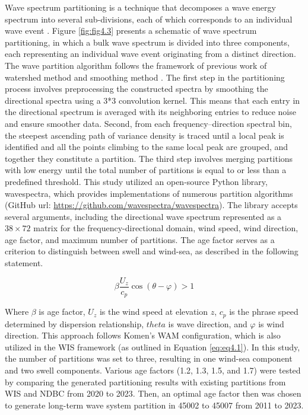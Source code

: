 Wave spectrum partitioning is a technique that decomposes a wave energy spectrum
into several sub-divisions, each of which corresponds to an individual wave
event \citep{portilla-yandun_wave_2015}. Figure \ref{fig:fig4.3} presents a
schematic of wave spectrum partitioning, in which a bulk wave spectrum is
divided into three components, each representing an individual wave event
originating from a distinct direction. The wave partition algorithm follows the
framework of previous work of watershed method \citep{hanson_automated_2001} and
smoothing method \citep{portilla_spectral_2009,portilla-yandun_wave_2015}. The
first step in the partitioning process involves preprocessing the constructed
spectra by smoothing the directional spectra using a 3*3 convolution kernel.
This means that each entry in the directional spectrum is averaged with its
neighboring entries to reduce noise and ensure smoother data. Second, from each
frequency–direction spectral bin, the steepest ascending path of variance
density is traced until a local peak is identified and all the points climbing
to the same local peak are grouped, and together they constitute a partition.
The third step involves merging partitions with low energy until the total
number of partitions is equal to or less than a predefined threshold. This study
utilized an open-source Python library, wavespectra, which provides
implementations of numerous partition algorithms (GitHub url:
\url{https://github.com/wavespectra/wavespectra}).  The library accepts several
arguments, including the directional wave spectrum represented as a $38\times72$
matrix for the frequency-directional domain, wind speed, wind direction, age
factor, and maximum number of partitions. The age factor serves as a criterion
to distinguish between swell and wind-sea, as described in the following
statement.


\begin{equation}
    \beta\frac{U_z}{c_p}\cos(\theta-\varphi) > 1
\label{eq:eq4.5}
\end{equation}

Where $\beta$ is age factor, $U_z$ is the wind speed at elevation $z$, $c_p$ is
the phrase speed determined by dispersion relationship, $theta$ is wave
direction, and $\varphi$ is wind direction. This approach follows Komen’s WAM
configuration, which is also utilized in the WIS framework (as outlined in
Equation \ref{eq:eq4.1}). In this study, the number of partitions was set to
three, resulting in one wind-sea component and two swell components. Various age
factors (1.2, 1.3, 1.5, and 1.7) were tested by comparing the generated
partitioning results with existing partitions from WIS and NDBC from 2020 to
2023. Then, an optimal age factor then was chosen to generate long-term wave
system partition in 45002 to 45007 from 2011 to 2023. 

